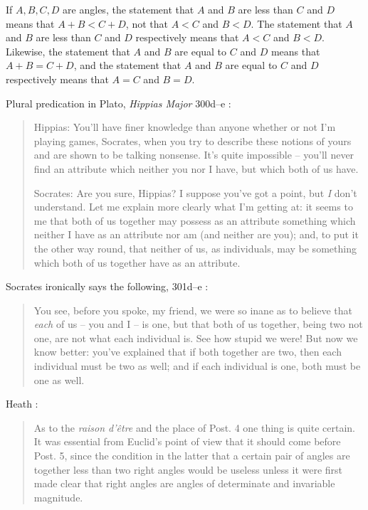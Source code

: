 \documentclass{article}
\begin{document}
If $A,B,C,D$ are angles, the statement that $A$ and $B$ are less than $C$ and $D$ means that
$A+B<C+D$, not that $A<C$ and $B<D$. The statement that $A$ and $B$ are less than $C$ and $D$ respectively means that
$A<C$ and $B<D$. Likewise, the statement that $A$ and $B$ are equal to $C$ and $D$ means that $A+B=C+D$, and the statement that $A$ and $B$ are equal to
 $C$ and $D$ respectively means that $A=C$ and $B=D$. 

Plural predication in Plato, {\em Hippias Major} 300d--e \cite[p.~259]{hippias}:

\begin{quote}
Hippias: You'll have  finer knowledge than anyone whether or not I'm
playing games, Socrates, when you try to describe these notions of yours
and are shown to be talking nonsense. It's quite impossible -- you'll never
find an attribute which neither you nor I have, but which both of us have.

Socrates: Are you sure, Hippias? I suppose you've got a point, but
{\em I} don't understand. Let me explain more clearly what I'm getting at: it
seems to me that both of us together may possess as an attribute something
which neither I have as an attribute nor am (and neither are you); and, to
put it the other way round, that neither of us, as individuals, may be
something which both of us together have as an attribute.
\end{quote}

Socrates ironically says the following, 301d--e \cite[p.~260]{hippias}:

\begin{quote}
You see, before you spoke, my friend,
we were so inane as to believe that {\em each} of us -- you and I -- is one, but that
both of us together, being two not one, are not what each individual is.
See how stupid we were! But now we know better: you've explained that
if both together are two, then each individual must be two as well; and if
each individual is one, both must be one as well.
\end{quote}

Heath \cite[p.~201]{euclidI}:

\begin{quote}
As to the {\em raison d'\^etre} and the place of Post. 4 one thing is quite certain.
It was essential from Euclid's point of view that it should come before Post. 5,
since the condition in the latter that a certain pair of angles are together less
than two right angles would be useless unless it were first made clear that
right angles are angles of determinate and invariable magnitude.
\end{quote}
\end{document}
